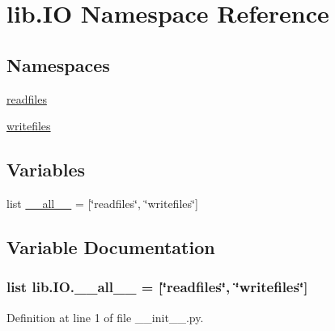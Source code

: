 \hypertarget{a00108}{\section{lib.\-I\-O Namespace Reference}
\label{a00108}
}
\subsection*{Namespaces}
\begin{DoxyCompactItemize}
\item 
\hyperlink{a00109}{readfiles}
\item 
\hyperlink{a00110}{writefiles}
\end{DoxyCompactItemize}
\subsection*{Variables}
\begin{DoxyCompactItemize}
\item 
list \hyperlink{a00108_ad1c2e5e5a0c13974253993ecd0f01d5c}{\-\_\-\-\_\-all\-\_\-\-\_\-} = \mbox{[}\char`\"{}readfiles\char`\"{}, \char`\"{}writefiles\char`\"{}\mbox{]}
\end{DoxyCompactItemize}


\subsection{Variable Documentation}
\hypertarget{a00108_ad1c2e5e5a0c13974253993ecd0f01d5c}{
\subsubsection[{\-\_\-\-\_\-all\-\_\-\-\_\-}]{\setlength{\rightskip}{0pt plus 5cm}list lib.\-I\-O.\-\_\-\-\_\-all\-\_\-\-\_\- = \mbox{[}\char`\"{}readfiles\char`\"{}, \char`\"{}writefiles\char`\"{}\mbox{]}}}\label{a00108_ad1c2e5e5a0c13974253993ecd0f01d5c}


Definition at line 1 of file \-\_\-\-\_\-init\-\_\-\-\_\-.\-py.

